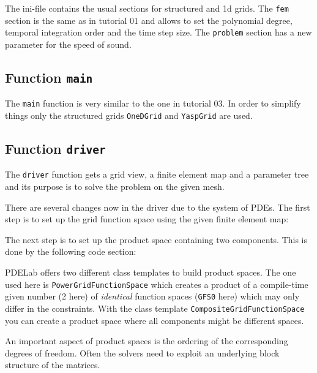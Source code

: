 \documentclass[a4paper,12pt]{article}
\begin{document}
The ini-file contains the usual sections for structured and 1d grids. The
\lstinline{fem} section is the same as in tutorial 01 and allows to set
the polynomial degree, temporal integration order and the time step size.
The \lstinline{problem} section has a new parameter for the speed of sound.


\subsection{Function \lstinline{main}}

The \lstinline{main} function is very similar to the one in tutorial 03.
In order to simplify things only the structured grids \lstinline{OneDGrid}
and \lstinline{YaspGrid} are used.

\subsection{Function \lstinline{driver}}
\label{sec:funct-driver}

The \lstinline{driver} function gets a grid view, a finite element
map and a parameter tree and its purpose is to solve the problem on
the given mesh.


There are several changes now in the driver due to the system of PDEs.
The first step is to set up the grid function space using the given finite
element map:


The next step is to set up the product space containing
two components. This is done by the following code section:

PDELab offers two different class templates to build product spaces. The
one used here is \lstinline{PowerGridFunctionSpace} which creates
a product of a compile-time given number (2 here)
of \textit{identical} function spaces (\lstinline{GFS0} here)
which may only differ in the constraints. With the
class template \lstinline{CompositeGridFunctionSpace} you can create
a product space where all components might be different spaces.

An important aspect of product spaces is the ordering of the corresponding degrees
of freedom. Often the solvers need to exploit an underlying block structure
of the matrices.
\end{document}
